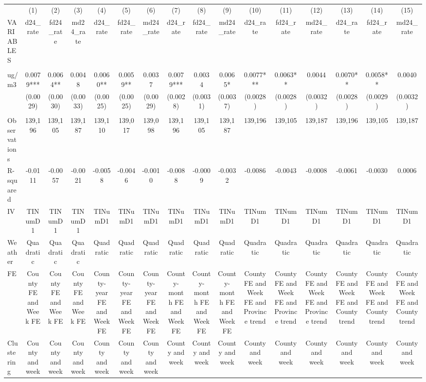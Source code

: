 \begin{tabular}{lccccccccccccccc} \hline
 & (1) & (2) & (3) & (4) & (5) & (6) & (7) & (8) & (9) & (10) & (11) & (12) & (13) & (14) & (15) \\
VARIABLES & d24\_rate & fd24\_rate & md24\_rate & d24\_rate & fd24\_rate & md24\_rate & d24\_rate & fd24\_rate & md24\_rate & d24\_rate & fd24\_rate & md24\_rate & d24\_rate & fd24\_rate & md24\_rate \\ \hline
 &  &  &  &  &  &  &  &  &  &  &  &  &  &  &  \\
ug/m3 & 0.0079*** & 0.0064** & 0.0048 & 0.0060** & 0.0059** & 0.0037 & 0.0079*** & 0.0034 & 0.0065* & 0.0077*** & 0.0063** & 0.0044 & 0.0070** & 0.0058** & 0.0040 \\
 & (0.0029) & (0.0030) & (0.0033) & (0.0025) & (0.0025) & (0.0029) & (0.0028) & (0.0031) & (0.0037) & (0.0028) & (0.0028) & (0.0032) & (0.0028) & (0.0029) & (0.0032) \\
 &  &  &  &  &  &  &  &  &  &  &  &  &  &  &  \\
Observations & 139,196 & 139,105 & 139,187 & 139,110 & 139,017 & 139,098 & 139,196 & 139,105 & 139,187 & 139,196 & 139,105 & 139,187 & 139,196 & 139,105 & 139,187 \\
R-squared & -0.0111 & -0.0057 & -0.0021 & -0.0058 & -0.0046 & -0.0010 & -0.0088 & -0.0009 & -0.0032 & -0.0086 & -0.0043 & -0.0008 & -0.0061 & -0.0030 & 0.0006 \\
IV & TINumD1 & TINumD1 & TINumD1 & TINumD1 & TINumD1 & TINumD1 & TINumD1 & TINumD1 & TINumD1 & TINumD1 & TINumD1 & TINumD1 & TINumD1 & TINumD1 & TINumD1 \\
Weather & Quadratic & Quadratic & Quadratic & Quadratic & Quadratic & Quadratic & Quadratic & Quadratic & Quadratic & Quadratic & Quadratic & Quadratic & Quadratic & Quadratic & Quadratic \\
FE & County FE and Week FE & County FE and Week FE & County FE and Week FE & County-year FE and Week FE & County-year FE and Week FE & County-year FE and Week FE & County-month FE and Week FE & County-month FE and Week FE & County-month FE and Week FE & County FE and Week FE and Province trend & County FE and Week FE and Province trend & County FE and Week FE and Province trend & County FE and Week FE and County trend & County FE and Week FE and County trend & County FE and Week FE and County trend \\
Clustering & County and week & County and week & County and week & County and week & County and week & County and week & County and week & County and week & County and week & County and week & County and week & County and week & County and week & County and week & County and week \\

\end{tabular}

